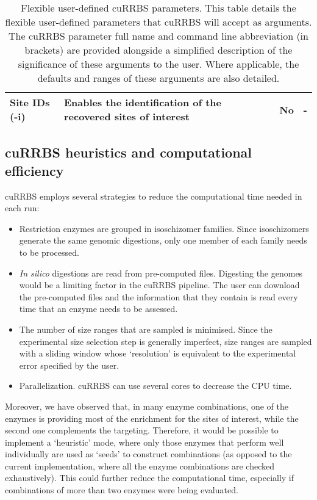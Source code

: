 \begin{table}
\begin{tabular}{ p{5cm} p{6.5cm} p{1cm} p{1.5cm} }
		Site IDs (-i) & Enables the identification of the recovered sites of interest & No & - \\
		\bottomrule
	\end{tabular}
	\vspace*{3mm}
	\caption[Flexible user-defined cuRRBS parameters]{Flexible user-defined cuRRBS parameters. This table details the flexible user-defined parameters that cuRRBS will accept as arguments. The cuRRBS parameter full name and command line abbreviation (in brackets) are provided alongside a simplified description of the significance of these arguments to the user. Where applicable, the defaults and ranges of these arguments are also detailed.}
	\label{table:c4_table1}
\end{table}


\subsection*{cuRRBS heuristics and computational efficiency}

cuRRBS employs several strategies to reduce the computational time needed in each run:

\begin{itemize}
	
	\item Restriction enzymes are grouped in isoschizomer families. Since isoschizomers generate the same genomic digestions, only one member of each family needs to be processed. 
	
	\item \textit{In silico} digestions are read from pre-computed files. Digesting the genomes would be a limiting factor in the cuRRBS pipeline. The user can download the pre-computed files \citep{Martin-Herranz2017} and the information that they contain is read every time that an enzyme needs to be assessed.
	
	\item The number of size ranges that are sampled is minimised. Since the experimental size selection step is generally imperfect, size ranges are sampled with a sliding window whose `resolution' is equivalent to the experimental error specified by the user. 
	
	\item Parallelization. cuRRBS can use several cores to decrease the \acrshort{CPU} time.

\end{itemize}

Moreover, we have observed that, in many enzyme combinations, one of the enzymes is providing most of the enrichment for the sites of interest, while the second one complements the targeting. Therefore, it would be possible to implement a `heuristic' mode, where only those enzymes that perform well individually are used as `seeds' to construct combinations (as opposed to the current implementation, where all the enzyme combinations are checked exhaustively). This could further reduce the computational time, especially if combinations of more than two enzymes were being evaluated. 

